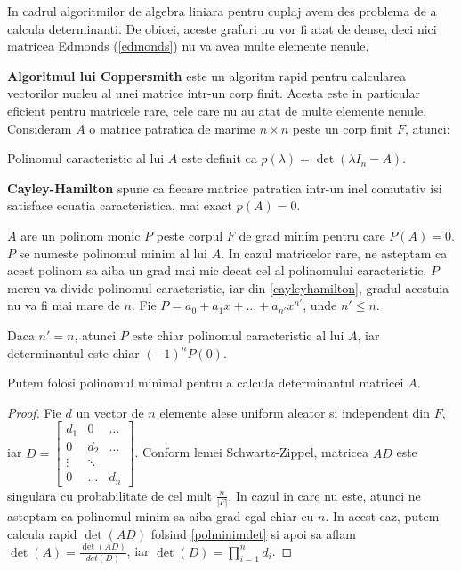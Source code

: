 In cadrul algoritmilor de algebra liniara pentru cuplaj avem des problema de a
calcula determinanti. De obicei, aceste grafuri nu vor fi atat de dense, deci
nici matricea Edmonds (\ref{edmonds}) nu va avea multe elemente nenule.

\textbf{Algoritmul lui Coppersmith} \cite{wiedemann} este un algoritm rapid pentru calcularea
vectorilor nucleu al unei matrice intr-un corp finit. Acesta este in particular
eficient pentru matricele rare, cele care nu au atat de multe elemente nenule. \\

Consideram $A$ o matrice patratica de marime $n \times n$ peste un corp finit $F$, atunci:

\begin{defn}
  Polinomul caracteristic al lui $A$ este definit ca
  $p(\lambda) = \det(\lambda I_{n} - A)$.
\end{defn}

\begin{thm}
  \label{cayleyhamilton}
  \textbf{Cayley-Hamilton} spune ca fiecare matrice patratica intr-un inel
  comutativ isi satisface ecuatia caracteristica, mai exact $p(A) = 0$.
\end{thm}

$A$ are un polinom monic $P$ peste corpul $F$ de grad minim pentru care
$P(A) = 0$. $P$ se numeste polinomul minim al lui $A$. In
cazul matricelor rare, ne asteptam ca acest polinom sa aiba un grad mai mic
decat cel al polinomului caracteristic. $P$ mereu va divide polinomul
caracteristic, iar din \ref{cayleyhamilton}, gradul acestuia nu va fi mai mare
de $n$. Fie $P = a_{0} + a_{1}x + \ldots + a_{n'}x^{n'}$, unde $n' \leq n$.

\begin{lem}
  \label{polminimdet}
  Daca $n' = n$, atunci $P$ este chiar polinomul caracteristic al lui $A$, iar
  determinantul este chiar $(-1)^{n}P(0)$.
\end{lem}

\begin{lem}
  Putem folosi polinomul minimal pentru a calcula determinantul matricei $A$.
\end{lem}

\begin{proof}
  Fie $d$ un vector de $n$ elemente
  alese uniform aleator si independent din $F$, iar
  $D =
  \begin{bmatrix}
    d_{1} & 0 & \dots \\
    0 & d_{2} & \dots \\
    \vdots & \ddots & \\
    0 & \dots & d_{n}
  \end{bmatrix}$. Conform lemei Schwartz-Zippel, matricea $AD$ este singulara cu
  probabilitate de cel mult $\frac{n}{|F|}$. In cazul in care nu este, atunci ne
  asteptam ca polinomul minim sa aiba grad egal chiar cu $n$. In acest caz,
  putem calcula rapid $\det(AD)$ folsind \ref{polminimdet} si apoi sa aflam
  $\det(A) = \frac{\det(AD)}{det(D)}$, iar $\det(D) = \prod_{i=1}^{n} d_{i}$.
\end{proof}

